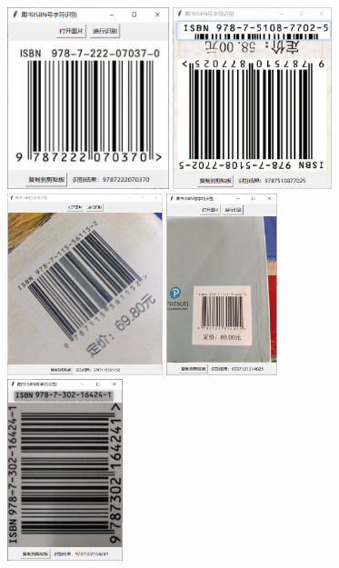 \documentclass{ctexart}
\begin{document}
\begin{figure}[H]
    \centering
    \includegraphics[height=150pt]{test_01}\quad
    \includegraphics[height=150pt]{test_02}\\
    \includegraphics[height=150pt]{test_03}\quad
    \includegraphics[height=150pt]{test_04}\\
    \includegraphics[height=150pt]{test_05}\quad

\end{figure}
\end{document}
